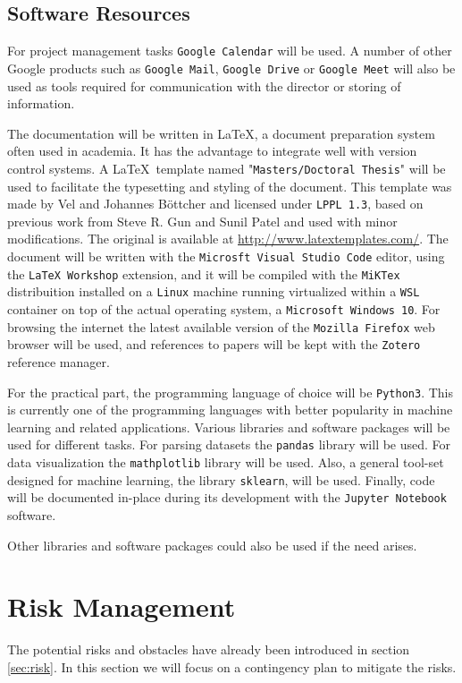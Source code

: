 \subsection{Software Resources}

For project management tasks \texttt{Google Calendar} will be used. A number of other Google products such as \texttt{Google Mail}, \texttt{Google Drive} or \texttt{Google Meet} will also be used as tools required for communication with the director or storing of information.

The documentation will be written in \LaTeX, a document preparation system often used in academia. It has the advantage to integrate well with version control systems. A \LaTeX \ template named "\texttt{Masters/Doctoral Thesis}" will be used to facil\-itate the type\-setting and styling of the document. This template was made by Vel and Johannes Böttcher and licensed under \texttt{LPPL 1.3}, based on previous work from Steve R. Gun and Sunil Patel and used with minor modifications. The original is available at \url{http://www.latextemplates.com/}. The document will be written with the \texttt{Microsft Visual Studio Code} editor, using the \texttt{LaTeX Workshop} extension, and it will be compiled with the \texttt{MiKTex} distribuition installed on a \texttt{Linux} machine run\-ning virtualized within a \texttt{WSL} container on top of the actual operating system, a \texttt{Microsoft Windows 10}. For browsing the internet the latest available version of the \texttt{Mozilla Firefox} web browser will be used, and references to papers will be kept with the \texttt{Zotero} reference manager.

For the practical part, the programming language of choice will be \texttt{Python3}. This is currently one of the programming languages with better popularity in machine learning and related applications. Various libraries and software packages will be used for different tasks. For parsing datasets the \texttt{pandas} library will be used. For data visualization the \texttt{mathplotlib} library will be used. Also, a general tool-set designed for machine learning, the library \texttt{sklearn}, will be used. Finally, code will be documented in-place during its development with the \texttt{Jupyter Notebook} software.

Other libraries and software packages could also be used if the need arises. 

\section{Risk Management}
\label{sec:risk_management}
The potential risks and obstacles have already been introduced in section \ref{sec:risk}. In this section we will focus on a contingency plan to mitigate the risks.

